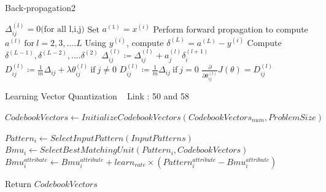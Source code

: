 \documentclass[a4paper]{article}
\begin{document}
\begin{algorithm}
   \caption{Back-propagation2 ~\cite{backpropagation2} }
    \begin{algorithmic}[1]
    \State $\Delta_{ij}^{(l)} = 0 \text{(for all l,i,j)}$
     \State Set $a^{(1)} = x ^ {(i)}$
     \State Perform forward propagation to compute $a^{(l)} \  \text{for} \  l =2,3,....L$
     \State Using $y^(i)$, compute $\delta^(L) = a^(L) - y^(i)$
     \State Compute $\delta^(L-1),\delta^(L-2),....\delta^(2) $
    \State $\Delta_{ij}^{(l)} \coloneqq \Delta_{ij}^{(l)} + a_{j}^{(l)}\delta_{i}^{(l+1)} $
      \EndFor
      \State $D_{ij}^{(l)} \coloneqq \frac{1}{m} \Delta_{ij} + \lambda \theta_{ij}^{(l)} \  \text{if}\  j \neq 0 $
      \State $D_{ij}^{(l)} \coloneqq \frac{1}{m} \Delta_{ij} \  \text{if}\  j = 0 $
      \State $\frac{\partial}{\partial\theta_{ij}^{(l)}}J(\theta) = D_{ij}^(l)$ 
      
    
    
    
\end{algorithmic}
\end{algorithm}


  \begin{algorithm}
   \caption{Learning Vector Quantization ~\cite{learningvector3} Link : 50 and 58}
    \begin{algorithmic}[1]
     \State $CodebookVectors \leftarrow InitializeCodebookVectors(CodebookVectors_{num},ProblemSize) $
     
    
            \State $Pattern_i \leftarrow SelectInputPattern(InputPatterns)$
            \State $Bmu_i \leftarrow SelectBestMatchingUnit(Pattern_i,CodebookVectors)$
            \State $Bmu_i^{attribute} \leftarrow Bmu_i^{attribute} + learn_{rate} \times (Pattern_i ^{attribute} - Bmu_i ^{attribute})  $
            \EndIf 
            \EndFor  
        \EndFor
        
       
       \State Return $CodebookVectors$



 

\end{algorithmic}
\end{algorithm}
\end{document}
